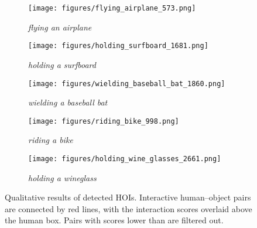 \documentclass[10pt,twocolumn,letterpaper]{article}
\begin{document}
\begin{figure*}[t]
    \begin{subfigure}[t]{0.19\linewidth}
        \centering
        \texttt{[image: figures/flying\_airplane\_573.png]}
        \caption{\textit{flying an airplane}}
        \label{fig:flying-airplane}
    \end{subfigure}
    \hfill \begin{subfigure}[t]{0.19\linewidth}
        \centering
        \texttt{[image: figures/holding\_surfboard\_1681.png]}
        \caption{\textit{holding a surfboard}}
        \label{fig:holding-surfboard}
    \end{subfigure}
    \hfill \begin{subfigure}[t]{0.19\linewidth}
        \centering
        \texttt{[image: figures/wielding\_baseball\_bat\_1860.png]}
        \caption{\textit{wielding a baseball bat}}
        \label{fig:wielding-baseball-bat}
    \end{subfigure}
    \hfill \begin{subfigure}[t]{0.19\linewidth}
        \centering
        \texttt{[image: figures/riding\_bike\_998.png]}
        \caption{\textit{riding a bike}}
        \label{fig:riding-bike}
    \end{subfigure}
    \hfill \begin{subfigure}[t]{0.19\linewidth}
        \centering
        \texttt{[image: figures/holding\_wine\_glasses\_2661.png]}
        \caption{\textit{holding a wineglass}}
        \label{fig:holding-wineglass}
    \end{subfigure}
    
    \caption{Qualitative results of detected HOIs. Interactive human--object pairs are connected by red lines, with the interaction scores overlaid above the human box. Pairs with scores lower than  are filtered out.}
    \label{fig:qualitative}
\end{figure*}
\end{document}
